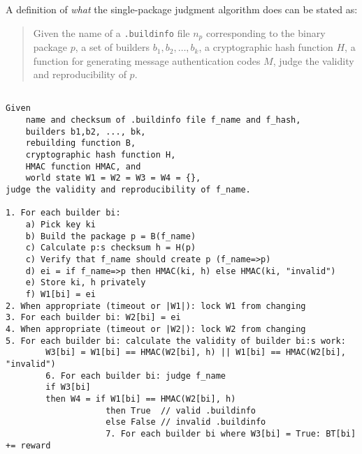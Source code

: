 A definition of \textit{what} the single-package judgment algorithm does can be stated as:

\begin{quote}
	Given the name of a \texttt{.buildinfo} file $n_p$ corresponding to the binary package $p$, a set of builders $b_1, b_2, \dotsc, b_k$, a cryptographic hash function $H$, a function for generating message authentication codes $M$, judge the validity and reproducibility of $p$.
\end{quote}

\begin{lstlisting}[tabsize=4]
	
Given 	
	name and checksum of .buildinfo file f_name and f_hash, 
	builders b1,b2, ..., bk,
	rebuilding function B,
	cryptographic hash function H,
	HMAC function HMAC, and
	world state W1 = W2 = W3 = W4 = {},
judge the validity and reproducibility of f_name.

1. For each builder bi:
	a) Pick key ki
	b) Build the package p = B(f_name)
	c) Calculate p:s checksum h = H(p)
	c) Verify that f_name should create p (f_name=>p)
	d) ei = if f_name=>p then HMAC(ki, h) else HMAC(ki, "invalid")
	e) Store ki, h privately
	f) W1[bi] = ei
2. When appropriate (timeout or |W1|): lock W1 from changing
3. For each builder bi: W2[bi] = ei
4. When appropriate (timeout or |W2|): lock W2 from changing
5. For each builder bi: calculate the validity of builder bi:s work:
		W3[bi] = W1[bi] == HMAC(W2[bi], h) || W1[bi] == HMAC(W2[bi], "invalid")
		6. For each builder bi: judge f_name
		if W3[bi]
		then W4 = if W1[bi] == HMAC(W2[bi], h)
					then True  // valid .buildinfo
					else False // invalid .buildinfo
					7. For each builder bi where W3[bi] = True: BT[bi] += reward
						
\end{lstlisting}